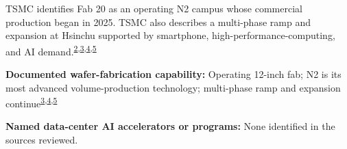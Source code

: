 \begin{minipage}[t][0.90\textheight][t]{\textwidth}
\begin{minipage}[t]{\textwidth}
\begin{minipage}[t]{0.32\textwidth}
\medskip
{\footnotesize TSMC identifies Fab 20 as an operating N2 campus whose commercial production began in 2025. TSMC also describes a multi-phase ramp and expansion at Hsinchu supported by smartphone, high-performance-computing, and AI demand.\nobreak\textsuperscript{\href{\detokenize{https://www.tsmc.com/english/aboutTSMC/TSMC_Fabs}}{\textcolor{accent}{2}},\href{\detokenize{https://investor.tsmc.com/sites/ir/sec-filings/2025_20F}\%\detokenize{20Report.pdf}}{\textcolor{accent}{3}},\href{\detokenize{https://www.tsmc.com/english/dedicatedFoundry/technology/logic/l_2nm}}{\textcolor{accent}{4}},\href{\detokenize{https://investor.tsmc.com/chinese/encrypt/files/encrypt_file/reports/2026-04/3cef85204275f94fd111485cfdf4adb3c0263c45/TSMC}\%\detokenize{201Q26}\%\detokenize{20Transcript.pdf}}{\textcolor{accent}{5}}}\par}
\medskip
{\footnotesize\textbf{Documented wafer-fabrication capability:} Operating 12-inch fab; N2 is its most advanced volume-production technology; multi-phase ramp and expansion continue\nobreak\textsuperscript{\href{\detokenize{https://investor.tsmc.com/sites/ir/sec-filings/2025_20F}\%\detokenize{20Report.pdf}}{\textcolor{accent}{3}},\href{\detokenize{https://www.tsmc.com/english/dedicatedFoundry/technology/logic/l_2nm}}{\textcolor{accent}{4}},\href{\detokenize{https://investor.tsmc.com/chinese/encrypt/files/encrypt_file/reports/2026-04/3cef85204275f94fd111485cfdf4adb3c0263c45/TSMC}\%\detokenize{201Q26}\%\detokenize{20Transcript.pdf}}{\textcolor{accent}{5}}}\par}
\end{minipage}
\end{minipage}
\par\vspace{0.65em}
\medskip
{\footnotesize\textbf{Named data-center AI accelerators or programs:} None identified in the sources reviewed.\par}
\medskip

\end{minipage}
